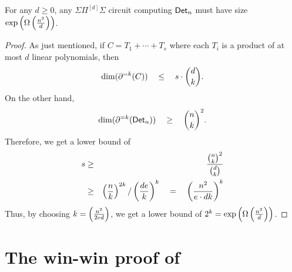 \begin{lemma}[\cite{nw1997}]\label{NW:d3hom-mainlemma} For any $d \geq 0$, any $\Sigma\Pi^{[d]}\Sigma$ circuit computing $\operatorname{\mathsf{Det}}_n$ must have size $\exp\left(\Omega\left(\frac{n^2}{d}\right)\right)$. 
\end{lemma}
\begin{proof}
As just mentioned, if $C = T_1 + \cdots + T_s$ where each $T_i$ is a product of at most $d$ linear polynomials, then 
\[
\dim(\partial^{=k}(C)) \quad \leq  \quad s \cdot \binom{d}{k}.
\]
On the other hand, 
\[
\dim(\partial^{=k}(\operatorname{\mathsf{Det}}_n)) \quad \geq  \quad \binom{n}{k}^2.
\]
Therefore, we get a lower bound of 
\begin{eqnarray*}
s & \geq & \frac{\binom{n}{k}^2}{\binom{d}{k}}\\
  & \geq & \left(\frac{n}{k}\right)^{2k} / \left(\frac{de}{k}\right)^k \quad = \quad \left(\frac{n^2}{e\cdot dk}\right)^k
\end{eqnarray*}
Thus, by choosing $k = \left(\frac{n^2}{2ed}\right)$, we get a lower bound of $2^k = \exp\left(\Omega\left(\frac{n^2}{d}\right)\right)$. 
\end{proof}


\section{The win-win proof of \cite{sw2001}}

